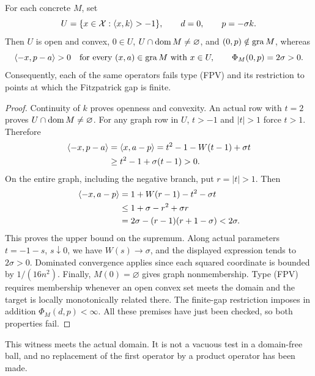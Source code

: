 \begin{corollary}\label{cor:fpv}
For each concrete $M$, set
\begin{equation}
U=\{x\in\mathcal X:\langle x,k\rangle>-1\},\qquad
d=0,\qquad p=-\sigma k.
\label{eq:cor-FPV-witness}
\end{equation}
Then $U$ is open and convex, $0\in U$, $U\cap\operatorname{dom} M\ne\varnothing$,
and $(0,p)\notin\operatorname{gra} M$, whereas
\begin{equation}
\langle -x,p-a\rangle>0
\quad\text{for every }(x,a)\in\operatorname{gra} M\text{ with }x\in U,
\qquad
\Phi_M(0,p)=2\sigma>0.
\label{eq:cor-FPV-checks}
\end{equation}
Consequently, each of the same operators fails type (FPV) and its
restriction to points at which the Fitzpatrick gap is finite.
\end{corollary}
\begin{proof}
Continuity of $k$ proves openness and convexity. An actual row with
$t=2$ proves $U\cap\operatorname{dom} M\ne\varnothing$. For any graph row in $U$,
$t>-1$ and $|t|>1$ force $t>1$. Therefore
\begin{align*}
\langle -x,p-a\rangle
&=\langle x,a-p\rangle=t^2-1-W(t-1)+\sigma t\\
&\ge t^2-1+\sigma(t-1)>0.
\end{align*}
On the entire graph, including the negative branch, put $r=|t|>1$.
Then
\begin{align*}
\langle -x,a-p\rangle
&=1+W(r-1)-t^2-\sigma t\\
&\le1+\sigma-r^2+\sigma r\\
&=2\sigma-(r-1)(r+1-\sigma)<2\sigma.
\end{align*}
This proves the upper bound on the supremum. Along actual parameters
$t=-1-s$, $s\downarrow0$, we have $W(s)\to\sigma$, and the displayed
expression tends to $2\sigma>0$. Dominated convergence applies since
each squared coordinate is bounded by $1/(16n^2)$.
Finally, $M(0)=\varnothing$ gives graph nonmembership. Type (FPV)
requires membership whenever an open convex set meets the domain and
the target is locally monotonically related there. The finite-gap
restriction imposes in addition $\Phi_M(d,p)<\infty$. All these premises
have just been checked, so both properties fail.
\end{proof}
This witness meets the actual domain. It is not a vacuous test in a
domain-free ball, and no replacement of the first operator by a product
operator has been made.

